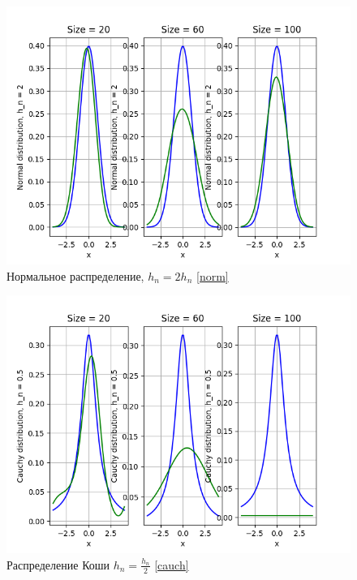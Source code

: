 \documentclass[a4paper]{article}
\begin{document}
        \begin{figure}[H]
            \centering
            \includegraphics[scale = 0.4]{Normal distribution, h_n = 2.png}
            \caption{Нормальное распределение, $h_n = 2 h_n$ \eqref{norm}}
            \label{fig:cauchy}
        \end{figure}
        
        \begin{figure}[H]
            \centering
            \includegraphics[scale = 0.4]{Cauchy distribution, h_n = 0.5.png}
            \caption{Распределение Коши $h_n = \frac{h_n}{2}$ \eqref{cauch}}
            \label{fig:cauchy}
        \end{figure}
        
\end{document}

